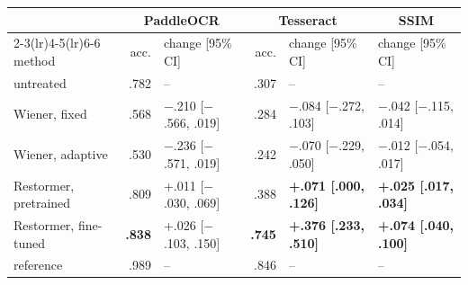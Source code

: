 \begin{tabular}{lrlrll}
\toprule
 & \multicolumn{2}{c}{PaddleOCR} & \multicolumn{2}{c}{Tesseract} & \multicolumn{1}{c}{SSIM} \\
\cmidrule(lr){2-3}\cmidrule(lr){4-5}\cmidrule(lr){6-6}
method & acc. & change [95\% CI] & acc. & change [95\% CI] & change [95\% CI] \\
\midrule
untreated & .782 & -- & .307 & -- & -- \\
Wiener, fixed & .568 & $-$.210 [$-$.566, .019] & .284 & $-$.084 [$-$.272, .103] & $-$.042 [$-$.115, .014] \\
Wiener, adaptive & .530 & $-$.236 [$-$.571, .019] & .242 & $-$.070 [$-$.229, .050] & $-$.012 [$-$.054, .017] \\
Restormer, pretrained & .809 & +.011 [$-$.030, .069] & .388 & \textbf{+.071 [.000, .126]} & \textbf{+.025 [.017, .034]} \\
Restormer, fine-tuned & \textbf{.838} & +.026 [$-$.103, .150] & \textbf{.745} & \textbf{+.376 [.233, .510]} & \textbf{+.074 [.040, .100]} \\
\midrule
reference & .989 & -- & .846 & -- & -- \\
\bottomrule
\end{tabular}
